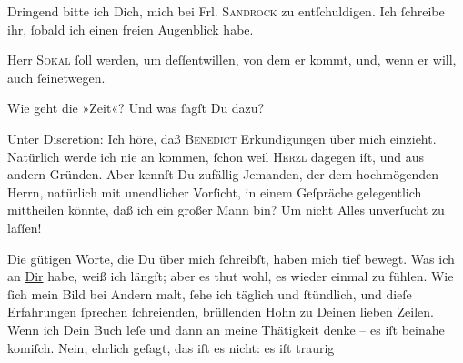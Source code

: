 \pstart
           Dringend bitte ich Dich, mich bei Frl. \textsc{Sandrock} zu entſchuldigen. Ich{ }ſchreibe ihr,{ }ſobald ich einen freien Augenblick
               habe.\pend
           
\pstart
           Herr \textsc{Sokal}{ }ſoll \label{K_L02622-8v}\label{K_L02622-8} werden, {\pb}um deſſentwillen, von dem er kommt, und, wenn er
               will, auch{ }ſeinetwegen.\pend
           
\pstart
           Wie geht die »Zeit«? Und was{ }ſagſt Du dazu?\pend
           
\pstart
           Unter Discretion: Ich höre, daß \textsc{Benedict} Erkundigungen über mich einzieht. Natürlich werde ich nie an \label{K_L02622-9v}\label{K_L02622-9} kommen,{ }ſchon weil \textsc{Herzl} dagegen iſt, und aus andern Gründen. Aber kennſt Du zufällig Jemanden, der dem
               hochmögenden Herrn, natürlich mit unendlicher
               Vorſicht, in einem Geſpräche gelegentlich mittheilen könnte, {\pb}daß ich ein großer Mann bin? Um nicht Alles
               unverſucht zu laſſen!\pend
           
\pstart
           Die gütigen Worte, die Du über mich{ }ſchreibſt, haben mich tief bewegt. Was ich an \uline{Dir} habe, weiß ich längſt; aber es thut wohl, es
               wieder einmal zu fühlen. Wie{ }ſich mein Bild bei Andern malt,{ }ſehe ich täglich und{ }ſtündlich, und dieſe Erfahrungen{ }ſprechen{ }ſchreienden, brüllenden Hohn zu Deinen
               lieben Zeilen. Wenn ich  Dein Buch leſe und dann an meine Thätigkeit denke –
                  {\pb}es iſt beinahe komiſch. Nein, ehrlich geſagt,
               das iſt es nicht: es iſt traurig{\dotsfour}\pend
           
